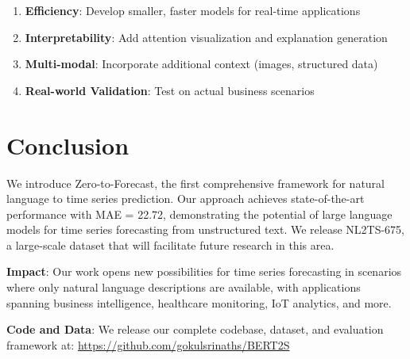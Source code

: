 \documentclass[11pt]{article}
\begin{document}
\begin{enumerate}
    \item \textbf{Efficiency}: Develop smaller, faster models for real-time applications
    \item \textbf{Interpretability}: Add attention visualization and explanation generation
    \item \textbf{Multi-modal}: Incorporate additional context (images, structured data)
    \item \textbf{Real-world Validation}: Test on actual business scenarios
\end{enumerate}

\section{Conclusion}

We introduce Zero-to-Forecast, the first comprehensive framework for natural language to time series prediction. Our approach achieves state-of-the-art performance with MAE = 22.72, demonstrating the potential of large language models for time series forecasting from unstructured text. We release NL2TS-675, a large-scale dataset that will facilitate future research in this area.

\textbf{Impact}: Our work opens new possibilities for time series forecasting in scenarios where only natural language descriptions are available, with applications spanning business intelligence, healthcare monitoring, IoT analytics, and more.

\textbf{Code and Data}: We release our complete codebase, dataset, and evaluation framework at: \url{https://github.com/gokulsrinaths/BERT2S}
\end{document}
